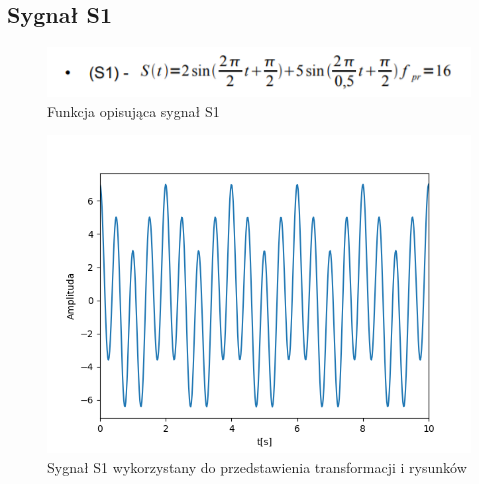 \documentclass[12pt]{article}
\begin{document}
\subsection{Sygnał S1}

\begin{figure}[H]
\centering
\includegraphics[scale=0.6]{sygnalS1.png}
\caption{Funkcja opisująca sygnał S1}
\end{figure}

\begin{figure}[H]
\centering
\includegraphics[scale=0.6]{sygnalS1rysunek.png}
\caption{Sygnał S1 wykorzystany do przedstawienia transformacji i rysunków}
\end{figure}
\end{document}
